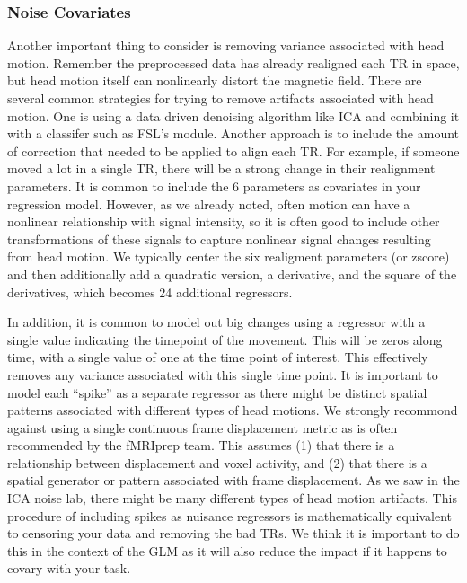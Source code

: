 \documentclass[letterpaper,10pt,english]{sphinxmanual}
\begin{document}
\subsubsection{Noise Covariates}
\label{\detokenize{content/GLM_Single_Subject_Model:noise-covariates}}
Another important thing to consider is removing variance associated with head motion. Remember the preprocessed data has already realigned each TR in space, but head motion itself can nonlinearly distort the magnetic field. There are several common strategies for trying to remove artifacts associated with head motion. One is using a data driven denoising algorithm like ICA and combining it with a classifer such as FSL’s  module. Another approach is to include the amount of correction that needed to be applied to align each TR. For example, if someone moved a lot in a single TR, there will be a strong change in their realignment parameters. It is common to include the 6 parameters as covariates in your regression model. However, as we already noted, often motion can have a nonlinear relationship with signal intensity, so it is often good to include other transformations of these signals to capture nonlinear signal changes resulting from head motion. We typically center the six realigment parameters (or zscore) and then additionally add a quadratic version, a derivative, and the square of the derivatives, which becomes 24 additional regressors.

In addition, it is common to model out big changes using a regressor with a single value indicating the timepoint of the movement. This will be zeros along time, with a single value of one at the time point of interest. This effectively removes any variance associated with this single time point. It is important to model each “spike” as a separate regressor as there might be distinct spatial patterns associated with different types of head motions. We strongly recommond against using a single continuous frame displacement metric as is often recommended by the fMRIprep team. This assumes (1) that there is a  relationship between displacement and voxel activity, and (2) that there is a  spatial generator or pattern associated with frame displacement. As we saw in the ICA noise lab, there might be many different types of head motion artifacts. This procedure of including spikes as nuisance regressors is mathematically equivalent to censoring your data and removing the bad TRs. We think it is important to do this in the context of the GLM as it will also reduce the impact if it happens to covary with your task.
\end{document}

